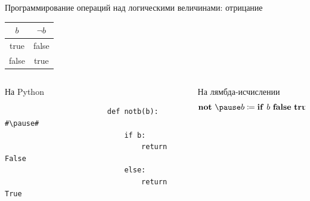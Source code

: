     \begin{frame}[fragile]{Программирование операций над логическими величинами: отрицание}
        \pause
        \begin{center}
            \begin{tabular}{|c|c|}
                \hline
                $b$   & $\neg b$ \\ \hline
                true  & false    \\
                false & true     \\ \hline
            \end{tabular}
        \end{center}

        \begin{columns}[onlytextwidth]
            \begin{column}[t]{0.485\textwidth}
                \begin{block}{На Python}
                    \begin{verbatim}
                        def notb(b): #\pause#
                            if b:
                                return False
                            else:
                                return True
                    \end{verbatim}
                \end{block}
            \end{column}\hfill
            \pause%
            \begin{column}[t]{0.485\textwidth}
                \begin{block}{На лямбда-исчислении}
                    \[
                        \term{not}~\pause b\termdef \term{if} \ap b \ap \term{false} \ap \term{true}
                    \]
                    \vspace{-1em}
                \end{block}
            \end{column}
        \end{columns}
    \end{frame}

